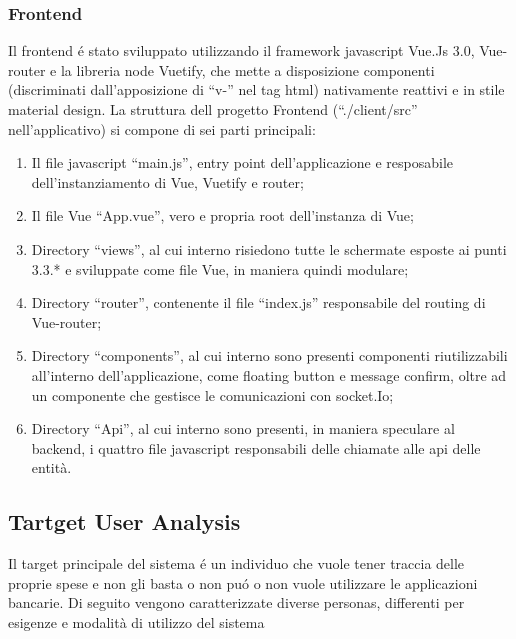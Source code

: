 \documentclass{report}
\begin{document}
\subsubsection{Frontend}
Il frontend é stato sviluppato utilizzando il framework javascript Vue.Js 3.0, Vue-router e la libreria node Vuetify, che mette a disposizione componenti (discriminati dall’apposizione di  “v-” nel tag html) nativamente reattivi e in stile material design.
\newline \newline
La struttura dell progetto Frontend (“./client/src” nell’applicativo)  si compone di sei parti principali:
\begin{enumerate}
    \item Il file javascript “main.js”, entry point dell’applicazione e resposabile dell’instanziamento di Vue, Vuetify e router;
    \item Il file Vue “App.vue”, vero e propria root dell’instanza di Vue;
    \item Directory “views”, al cui interno risiedono tutte le schermate esposte ai punti 3.3.* e sviluppate come file Vue, in maniera quindi modulare;
    \item Directory “router”, contenente il file “index.js” responsabile del routing di Vue-router;
    \item Directory “components”, al cui interno sono presenti componenti riutilizzabili all’interno dell’applicazione, come floating button e message confirm, oltre ad un componente che gestisce le comunicazioni con socket.Io;
    \item Directory “Api”, al cui interno sono presenti, in maniera speculare al backend, i quattro file javascript responsabili delle chiamate alle api delle entità.
\end{enumerate}

\subsection{Tartget User Analysis}
Il target principale del sistema é un individuo che vuole tener traccia delle proprie spese e non gli basta o non puó o non vuole utilizzare le applicazioni bancarie.
\newline \newline
Di seguito vengono caratterizzate diverse personas, differenti per esigenze e modalità di utilizzo del sistema
\end{document}
